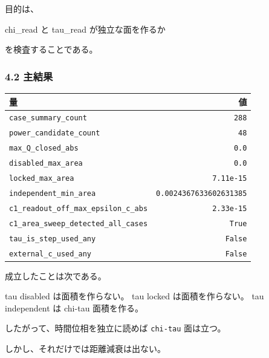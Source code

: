 \documentclass[
]{article}
\newenvironment{Shaded}{}{}
\newcommand{\NormalTok}[1]{#1}
\newcounter{none} %
\begin{document}
目的は、

\begin{Shaded}
\begin{Highlighting}[]
\NormalTok{chi\_read と tau\_read が独立な面を作るか}
\end{Highlighting}
\end{Shaded}

を検査することである。

\subsubsection{4.2 主結果}\label{ux4e3bux7d50ux679c-2}

{\def\LTcaptype{none} %
\begin{longtable}[]{@{}lr@{}}
\toprule\noalign{}
量 & 値 \\
\midrule\noalign{}
\endhead
\bottomrule\noalign{}
\endlastfoot
\texttt{case\_summary\_count} & \texttt{288} \\
\texttt{power\_candidate\_count} & \texttt{48} \\
\texttt{max\_Q\_closed\_abs} & \texttt{0.0} \\
\texttt{disabled\_max\_area} & \texttt{0.0} \\
\texttt{locked\_max\_area} & \texttt{7.11e-15} \\
\texttt{independent\_min\_area} & \texttt{0.0024367633602631385} \\
\texttt{c1\_readout\_off\_max\_epsilon\_c\_abs} & \texttt{2.33e-15} \\
\texttt{c1\_area\_sweep\_detected\_all\_cases} & \texttt{True} \\
\texttt{tau\_is\_step\_used\_any} & \texttt{False} \\
\texttt{external\_c\_used\_any} & \texttt{False} \\
\end{longtable}
}

成立したことは次である。

\begin{Shaded}
\begin{Highlighting}[]
\NormalTok{tau disabled は面積を作らない。}
\NormalTok{tau locked は面積を作らない。}
\NormalTok{tau independent は chi{-}tau 面積を作る。}
\end{Highlighting}
\end{Shaded}

したがって、時間位相を独立に読めば \texttt{chi-tau} 面は立つ。

しかし、それだけでは距離減衰は出ない。
\end{document}
